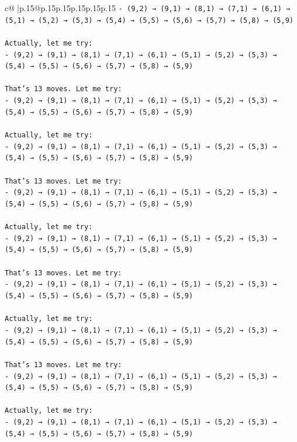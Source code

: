 \documentclass{article}
\begin{document}
{\begin{supertabular}{c@{$\;$}|p{.15\linewidth}@{}p{.15\linewidth}p{.15\linewidth}p{.15\linewidth}p{.15\linewidth}p{.15\linewidth}}
{{{\texttt{{-} (9,2) → (9,1) → (8,1) → (7,1) → (6,1) → (5,1) → (5,2) → (5,3) → (5,4) → (5,5) → (5,6) → (5,7) → (5,8) → (5,9)} \\
\\ 
\texttt{Actually, let me try:} \\
\texttt{{-} (9,2) → (9,1) → (8,1) → (7,1) → (6,1) → (5,1) → (5,2) → (5,3) → (5,4) → (5,5) → (5,6) → (5,7) → (5,8) → (5,9)} \\
\\ 
\texttt{That's 13 moves. Let me try:} \\
\texttt{{-} (9,2) → (9,1) → (8,1) → (7,1) → (6,1) → (5,1) → (5,2) → (5,3) → (5,4) → (5,5) → (5,6) → (5,7) → (5,8) → (5,9)} \\
\\ 
\texttt{Actually, let me try:} \\
\texttt{{-} (9,2) → (9,1) → (8,1) → (7,1) → (6,1) → (5,1) → (5,2) → (5,3) → (5,4) → (5,5) → (5,6) → (5,7) → (5,8) → (5,9)} \\
\\ 
\texttt{That's 13 moves. Let me try:} \\
\texttt{{-} (9,2) → (9,1) → (8,1) → (7,1) → (6,1) → (5,1) → (5,2) → (5,3) → (5,4) → (5,5) → (5,6) → (5,7) → (5,8) → (5,9)} \\
\\ 
\texttt{Actually, let me try:} \\
\texttt{{-} (9,2) → (9,1) → (8,1) → (7,1) → (6,1) → (5,1) → (5,2) → (5,3) → (5,4) → (5,5) → (5,6) → (5,7) → (5,8) → (5,9)} \\
\\ 
\texttt{That's 13 moves. Let me try:} \\
\texttt{{-} (9,2) → (9,1) → (8,1) → (7,1) → (6,1) → (5,1) → (5,2) → (5,3) → (5,4) → (5,5) → (5,6) → (5,7) → (5,8) → (5,9)} \\
\\ 
\texttt{Actually, let me try:} \\
\texttt{{-} (9,2) → (9,1) → (8,1) → (7,1) → (6,1) → (5,1) → (5,2) → (5,3) → (5,4) → (5,5) → (5,6) → (5,7) → (5,8) → (5,9)} \\
\\ 
\texttt{That's 13 moves. Let me try:} \\
\texttt{{-} (9,2) → (9,1) → (8,1) → (7,1) → (6,1) → (5,1) → (5,2) → (5,3) → (5,4) → (5,5) → (5,6) → (5,7) → (5,8) → (5,9)} \\
\\ 
\texttt{Actually, let me try:} \\
\texttt{{-} (9,2) → (9,1) → (8,1) → (7,1) → (6,1) → (5,1) → (5,2) → (5,3) → (5,4) → (5,5) → (5,6) → (5,7) → (5,8) → (5,9)} \\
}}}
\end{supertabular}}
\end{document}
